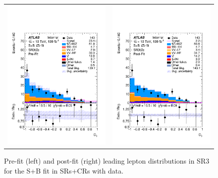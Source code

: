 \begin{figure}[htbp]
	\centering
	\begin{tabular}{cc}
		\includegraphics[width=.45\textwidth]{Chapters/CH8/figures/SPLUSB_CRSR_DL1rc_unblind/Plots/SR3} &
		\includegraphics[width=.45\textwidth]{Chapters/CH8/figures/SPLUSB_CRSR_DL1rc_unblind/Plots/SR3_postFit} \\
	\end{tabular}
	\caption{Pre-fit (left) and post-fit (right) leading lepton \pt distributions in SR3 for the S+B \tZc fit in SRs+CRs with data.
		\ErrStatSys
	}%
	\label{fig:stat:tzc:splusb:crsr:srplots:2_unb}
\end{figure}

